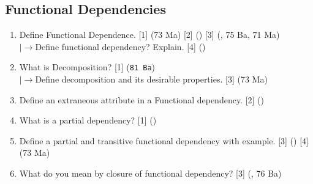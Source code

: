 \documentclass[12pt]{article}
\newcommand{\lb}{\\$\left|\rightarrow\right.$}
\begin{document}
    \subsection{Functional Dependencies}
    \begin{enumerate}[noitemsep, topsep = 0pt]
        \item Define Functional Dependence. \hfill [1] (73 Ma) [2]  () [3] (, 75 Ba, 71 Ma)
        \lb Define functional dependency? Explain. \hfill [4] ()
        
        \item What is Decomposition? \hfill [1] (\texttt{81 Ba})
        \lb Define decomposition and its desirable properties. \hfill [3] (73 Ma)
        
        \item Define an extraneous attribute in a Functional dependency. \hfill [2] ()
        
        \item What is a partial dependency? \hfill [1] ()
        
        \item Define a partial and transitive functional dependency with example. \hfill [3] () [4] (73 Ma)
        
        \item What do you mean by closure of functional dependency? \hfill [3] (, 76 Ba)
    \end{enumerate}
\end{document}
